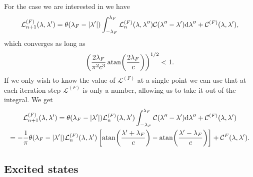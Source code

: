 \documentclass[11pt, a4paper]{report} %
\newcommand{\inversetruncc}{\mathcal{L}}
\newcommand{\kernel}{\mathcal{C}}
\begin{document}
For the case we are interested in we have 
\begin{equation}
  \inversetruncc^{(F)}_{n+1} (\lambda, \lambda') = \theta(\lambda_F - \abs{\lambda'}) \int_{-\lambda_F}^{\lambda_F} \inversetruncc^{(F)}_n(\lambda, \lambda'') \kernel (\lambda''-\lambda') \dd \lambda'' + \kernel^{(F)}(\lambda, \lambda'),
\end{equation}
which converges as long as 
\begin{equation}
\left(\frac{2\lambda_F}{\pi^2c^3} \atan(\frac{2\lambda_F}{c})\right)^{1/2} < 1.
\end{equation}
If we only wish to know the value of $\inversetruncc^{(F)}$ at a single point we can
use that at each iteration step $\inversetruncc^{(F)}$ is only a number, allowing us to take it out of the integral. 
We get
\begin{gather}
  \inversetruncc^{(F)}_{n+1} (\lambda, \lambda') = \theta(\lambda_F - \abs{\lambda'})  \inversetruncc^{(F)}_n(\lambda, \lambda') \int_{-\lambda_F}^{\lambda_F} \kernel (\lambda''-\lambda') \dd \lambda'' + \kernel^{(F)}(\lambda, \lambda')\\
= - \frac{1}{\pi} \theta(\lambda_F - \abs{\lambda'}) \inversetruncc^{(F)}_n(\lambda, \lambda') \left[ \atan(\frac{\lambda'+\lambda_F}{c}) - \atan(\frac{\lambda'-\lambda_F}{c})\right] + \kernel^{F}(\lambda,\lambda').
\end{gather}

\subsection{Excited states}
\end{document}
